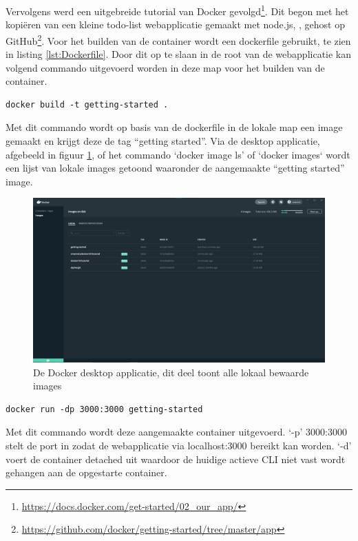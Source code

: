 Vervolgens werd een uitgebreide tutorial van Docker gevolgd\footnote{\url{https://docs.docker.com/get-started/02_our_app/}}. Dit begon met het kopiëren van een kleine todo-list webapplicatie gemaakt met node.js, , gehost op GitHub\footnote{\url{https://github.com/docker/getting-started/tree/master/app}}. Voor het builden van de container wordt een dockerfile gebruikt, te zien in listing \ref{lst:Dockerfile}. Door dit op te slaan in de root van de webapplicatie kan volgend commando uitgevoerd worden in deze map voor het builden van de container.
\begin{verbatim}
docker build -t getting-started .
\end{verbatim}
Met dit commando wordt op basis van de dockerfile in de lokale map een image gemaakt en krijgt deze de tag “getting started”. Via de desktop applicatie, afgebeeld in figuur \ref{fig:Dockerdesktop}, of het commando `docker image ls' of `docker images` wordt een lijst van lokale images getoond waaronder de aangemaakte “getting started” image.
\begin{figure}[h]
    \includegraphics[width=\linewidth]{img/dockerImg.png}
    \caption[De Docker desktop applicatie]{De Docker desktop applicatie, dit deel toont alle lokaal bewaarde images}
    \label{fig:Dockerdesktop}
    \centering
\end{figure}
\begin{verbatim}
docker run -dp 3000:3000 getting-started
\end{verbatim}
Met dit commando wordt deze aangemaakte container uitgevoerd. ‘-p’ 3000:3000 stelt de port in zodat de webapplicatie via localhost:3000 bereikt kan worden. ‘-d’ voert de container detached uit waardoor de huidige actieve CLI niet vast wordt gehangen aan de opgestarte container.

